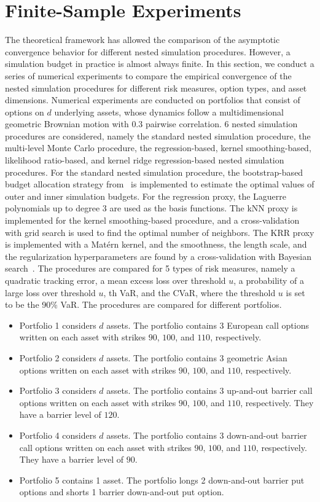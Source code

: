 \section{Finite-Sample Experiments} \label{sec1:numerical-experiments}
The theoretical framework has allowed the comparison of the asymptotic convergence behavior for different nested simulation procedures.
However, a simulation budget in practice is almost always finite.
In this section, we conduct a series of numerical experiments to compare the empirical convergence of the nested simulation procedures for different risk measures, option types, and asset dimensions.
Numerical experiments are conducted on portfolios that consist of options on $d$ underlying assets, whose dynamics follow a multidimensional geometric Brownian motion with $0.3$ pairwise correlation.
6 nested simulation procedures are considered, namely the standard nested simulation procedure, the multi-level Monte Carlo procedure, the regression-based, kernel smoothing-based, likelihood ratio-based, and kernel ridge regression-based nested simulation procedures.
For the standard nested simulation procedure, the bootstrap-based budget allocation strategy from~\cite{zhang2021bootstrap} is implemented to estimate the optimal values of outer and inner simulation budgets.
For the regression proxy, the Laguerre polynomials up to degree $3$ are used as the basis functions.
The kNN proxy is implemented for the kernel smoothing-based procedure, and a cross-validation with grid search is used to find the optimal number of neighbors.
The KRR proxy is implemented with a Mat\'ern kernel, and the smoothness, the length scale, and the regularization hyperparameters are found by a cross-validation with Bayesian search~\citep{frazier2018bayesian}.
The procedures are compared for 5 types of risk measures, namely a quadratic tracking error, a mean excess loss over threshold $u$, a probability of a large loss over threshold $u$, th VaR, and the CVaR, where the threshold $u$ is set to be the 90\% VaR.
The procedures are compared for different portfolios.
\begin{itemize}
    \item   Portfolio 1 considers $d$ assets.
    The portfolio contains 3 European call options written on each asset with strikes $90$, $100$, and $110$, respectively. 
    \item   Portfolio 2 considers $d$ assets.
    The portfolio contains 3 geometric Asian options written on each asset with strikes $90$, $100$, and $110$, respectively. 
    \item   Portfolio 3 considers $d$ assets.
    The portfolio contains 3 up-and-out barrier call options written on each asset with strikes $90$, $100$, and $110$, respectively. They have a barrier level of $120$.
    \item   Portfolio 4 considers $d$ assets.
    The portfolio contains 3 down-and-out barrier call options written on each asset with strikes $90$, $100$, and $110$, respectively. They have a barrier level of $90$.
    \item   Portfolio 5 contains 1 asset.
    The portfolio longs 2 down-and-out barrier put options and shorts 1 barrier down-and-out put option. 
\end{itemize}
